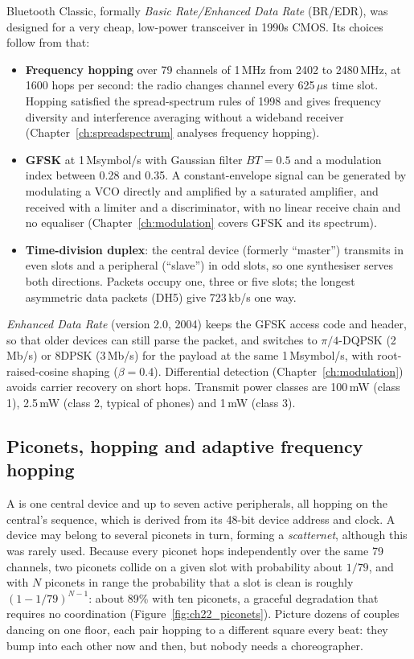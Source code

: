 Bluetooth Classic, formally \emph{Basic Rate/Enhanced Data Rate} (BR/EDR), was designed for a very
cheap, low-power transceiver in 1990s CMOS. Its choices follow from that:
\begin{itemize}
\item \textbf{Frequency hopping} over 79 channels of 1\,MHz from 2402 to 2480\,MHz, at 1600 hops per
second: the radio changes channel every 625\,$\mu$s time slot. Hopping satisfied the spread-spectrum
rules of 1998 and gives frequency diversity and interference averaging without a wideband receiver
(Chapter~\ref{ch:spreadspectrum} analyses frequency hopping).
\item \textbf{GFSK} at 1\,Msymbol/s with Gaussian filter $BT=0.5$ and a modulation index between 0.28
and 0.35. A constant-envelope signal can be generated by modulating a VCO directly and amplified by a
saturated amplifier, and received with a limiter and a discriminator, with no linear receive chain
and no equaliser (Chapter~\ref{ch:modulation} covers GFSK and its spectrum).
\item \textbf{Time-division duplex}: the central device (formerly ``master'') transmits in even slots
and a peripheral (``slave'') in odd slots, so one synthesiser serves both directions. Packets occupy
one, three or five slots; the longest asymmetric data packets (DH5) give 723\,kb/s one way.
\end{itemize}
\emph{Enhanced Data Rate} (version 2.0, 2004) keeps the GFSK access code and header, so that older
devices can still parse the packet, and switches to $\pi/4$-DQPSK (2\,Mb/s) or 8DPSK (3\,Mb/s) for the
payload at the same 1\,Msymbol/s, with root-raised-cosine shaping ($\beta=0.4$). Differential
detection (Chapter~\ref{ch:modulation}) avoids carrier recovery on short hops. Transmit power classes
are 100\,mW (class 1), 2.5\,mW (class 2, typical of phones) and 1\,mW (class 3).

\subsection{Piconets, hopping and adaptive frequency hopping}

A  is one central device and up to seven active peripherals, all hopping on the
central's sequence, which is derived from its 48-bit device address and clock. A device may belong to
several piconets in turn, forming a \emph{scatternet}, although this was rarely used. Because every
piconet hops independently over the same 79 channels, two piconets collide on a given slot with
probability about $1/79$, and with $N$ piconets in range the probability that a slot is clean is
roughly $(1-1/79)^{N-1}$: about 89\% with ten piconets, a graceful degradation that requires no
coordination (Figure~\ref{fig:ch22_piconets}). Picture dozens of couples dancing on one floor, each
pair hopping to a different square every beat: they bump into each other now and then, but nobody
needs a choreographer.

